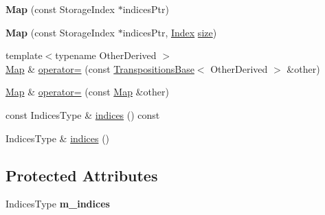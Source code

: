 \begin{DoxyCompactItemize}
\item 
\mbox{\label{class_eigen_1_1_map_3_01_transpositions_3_01_size_at_compile_time_00_01_max_size_at_compile_timecc993082d7c0ba51ca94b27e97da8dd3_a3c4be558224760d052bfb9ec2d10c40f}} 
{\bfseries Map} (const Storage\+Index $\ast$indices\+Ptr)
\item 
\mbox{\label{class_eigen_1_1_map_3_01_transpositions_3_01_size_at_compile_time_00_01_max_size_at_compile_timecc993082d7c0ba51ca94b27e97da8dd3_ad37331d919ec50860540347c770106ec}} 
{\bfseries Map} (const Storage\+Index $\ast$indices\+Ptr, \hyperlink{class_eigen_1_1_transpositions_base_a3f5f06118b419e8e6ccbe49ed5b4c91f}{Index} \hyperlink{class_eigen_1_1_transpositions_base_a6888d6261a9cc24ee8607496e610a5a3}{size})
\item 
{\footnotesize template$<$typename Other\+Derived $>$ }\\\hyperlink{group___core___module_class_eigen_1_1_map}{Map} \& \hyperlink{class_eigen_1_1_map_3_01_transpositions_3_01_size_at_compile_time_00_01_max_size_at_compile_timecc993082d7c0ba51ca94b27e97da8dd3_a903d189a8b363033ec9b1cba0190b11b}{operator=} (const \hyperlink{class_eigen_1_1_transpositions_base}{Transpositions\+Base}$<$ Other\+Derived $>$ \&other)
\item 
\hyperlink{group___core___module_class_eigen_1_1_map}{Map} \& \hyperlink{class_eigen_1_1_map_3_01_transpositions_3_01_size_at_compile_time_00_01_max_size_at_compile_timecc993082d7c0ba51ca94b27e97da8dd3_aaafbdb07fbd22f5ac9171e6b03d783f4}{operator=} (const \hyperlink{group___core___module_class_eigen_1_1_map}{Map} \&other)
\item 
const Indices\+Type \& \hyperlink{class_eigen_1_1_map_3_01_transpositions_3_01_size_at_compile_time_00_01_max_size_at_compile_timecc993082d7c0ba51ca94b27e97da8dd3_a08d5e1dd2e82fc92b82873bf740e4f24}{indices} () const
\item 
Indices\+Type \& \hyperlink{class_eigen_1_1_map_3_01_transpositions_3_01_size_at_compile_time_00_01_max_size_at_compile_timecc993082d7c0ba51ca94b27e97da8dd3_a1f8c96b93122a0e3237a05c11e8812c5}{indices} ()
\end{DoxyCompactItemize}
\subsection*{Protected Attributes}
\begin{DoxyCompactItemize}
\item 
\mbox{\label{class_eigen_1_1_map_3_01_transpositions_3_01_size_at_compile_time_00_01_max_size_at_compile_timecc993082d7c0ba51ca94b27e97da8dd3_a69f4eecaa40441d4ce0487630aaafc31}} 
Indices\+Type {\bfseries m\+\_\+indices}
\end{DoxyCompactItemize}


